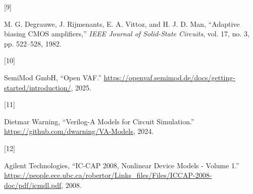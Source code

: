 \documentclass[
  a4paper,
  DIV=11,
  numbers=noendperiod]{scrreprt}
\newlength{\cslhangindent}
\newlength{\csllabelwidth}
\newenvironment{CSLReferences}[2] %
 {\begin{list}{}{%
  \setlength{\itemindent}{0pt}
  \setlength{\leftmargin}{0pt}
  \setlength{\parsep}{0pt}
  \ifodd #1
   \setlength{\leftmargin}{\cslhangindent}
   \setlength{\itemindent}{-1\cslhangindent}
  \fi
  \setlength{\itemsep}{#2\baselineskip}}}
 {\end{list}}
\newcommand{\CSLLeftMargin}[1]{\parbox[t]{\csllabelwidth}{\strut#1\strut}}
\newcommand{\CSLRightInline}[1]{\parbox[t]{\linewidth - \csllabelwidth}{\strut#1\strut}}
\begin{document}
\begin{CSLReferences}{0}{0}
\CSLLeftMargin{{[}9{]} }%
\CSLRightInline{M. G. Degrauwe, J. Rijmenants, E. A. Vittoz, and H. J.
D. Man, {``{Adaptive biasing CMOS amplifiers},''} \emph{IEEE Journal of
Solid-State Circuits}, vol. 17, no. 3, pp. 522--528, 1982.}

\CSLLeftMargin{{[}10{]} }%
\CSLRightInline{SemiMod GmbH, {``{Open VAF}.''}
\url{https://openvaf.semimod.de/docs/getting-started/introduction/},
2025.}

\CSLLeftMargin{{[}11{]} }%
\CSLRightInline{Dietmar Warning, {``{Verilog-A Models for Circuit
Simulation}.''} \url{https://github.com/dwarning/VA-Models}, 2024.}

\CSLLeftMargin{{[}12{]} }%
\CSLRightInline{Agilent Technologies, {``{IC-CAP 2008, Nonlinear Device
Models - Volume 1}.''}
\url{https://people.ece.ubc.ca/robertor/Links_files/Files/ICCAP-2008-doc/pdf/icmdl.pdf},
2008.}

\end{CSLReferences}
\end{document}
